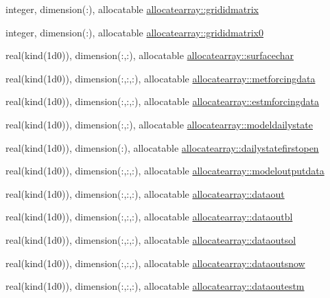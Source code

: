 \begin{DoxyCompactItemize}
\item 
integer, dimension(\+:), allocatable \hyperlink{namespaceallocatearray_aaa33b997b1acf75030be64062214ccca}{allocatearray\+::grididmatrix}
\item 
integer, dimension(\+:), allocatable \hyperlink{namespaceallocatearray_a603f404abac892ea63b945352623553e}{allocatearray\+::grididmatrix0}
\item 
real(kind(1d0)), dimension(\+:,\+:), allocatable \hyperlink{namespaceallocatearray_a2949f0a79f6170fceeef0c4b023e219d}{allocatearray\+::surfacechar}
\item 
real(kind(1d0)), dimension(\+:,\+:,\+:), allocatable \hyperlink{namespaceallocatearray_aa263d396297f85dc10ee06a484ffcde6}{allocatearray\+::metforcingdata}
\item 
real(kind(1d0)), dimension(\+:,\+:,\+:), allocatable \hyperlink{namespaceallocatearray_aa23b27435b5039423f72672a260b1482}{allocatearray\+::estmforcingdata}
\item 
real(kind(1d0)), dimension(\+:,\+:), allocatable \hyperlink{namespaceallocatearray_aa7293bcc78f5a7d94634e14eeabaa810}{allocatearray\+::modeldailystate}
\item 
real(kind(1d0)), dimension(\+:), allocatable \hyperlink{namespaceallocatearray_a17d36472decf8d3a565e2fa091414748}{allocatearray\+::dailystatefirstopen}
\item 
real(kind(1d0)), dimension(\+:,\+:,\+:), allocatable \hyperlink{namespaceallocatearray_a24801c67e9fc5e31774d0495327b964a}{allocatearray\+::modeloutputdata}
\item 
real(kind(1d0)), dimension(\+:,\+:,\+:), allocatable \hyperlink{namespaceallocatearray_ac655e803ebc3ca4bbd2e53835293f4f2}{allocatearray\+::dataout}
\item 
real(kind(1d0)), dimension(\+:,\+:,\+:), allocatable \hyperlink{namespaceallocatearray_a668365934e66c156613eaf3027add7a4}{allocatearray\+::dataoutbl}
\item 
real(kind(1d0)), dimension(\+:,\+:,\+:), allocatable \hyperlink{namespaceallocatearray_a54b22af9df4a501bb6faf47c84186071}{allocatearray\+::dataoutsol}
\item 
real(kind(1d0)), dimension(\+:,\+:,\+:), allocatable \hyperlink{namespaceallocatearray_a7e6a4164edb43537d8e21816ee3e33e9}{allocatearray\+::dataoutsnow}
\item 
real(kind(1d0)), dimension(\+:,\+:,\+:), allocatable \hyperlink{namespaceallocatearray_a2eb31590a1528d550321d141efaf4c4b}{allocatearray\+::dataoutestm}
\item 

\end{DoxyCompactItemize}
